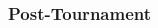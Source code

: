 \begin{CJK}{UTF8}{gbsn}
       \subsubsection{Post-Tournament\label{app8:prediction2aPost}}



            



\end{CJK}
